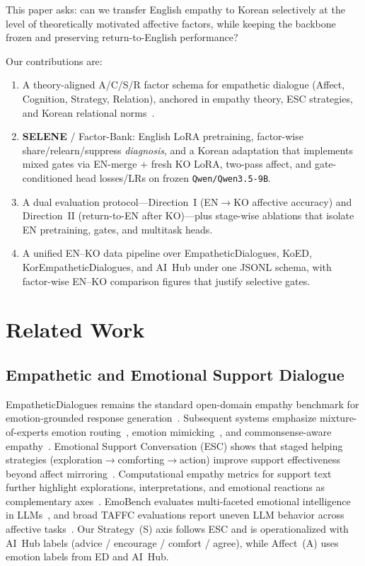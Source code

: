 \documentclass[journal]{IEEEtran}
\begin{document}
This paper asks: can we transfer English empathy to Korean selectively at the level of theoretically motivated affective factors, while keeping the backbone frozen and preserving return-to-English performance?

Our contributions are:
\begin{enumerate}
\item A theory-aligned A/C/S/R factor schema for empathetic dialogue (Affect, Cognition, Strategy, Relation), anchored in empathy theory, ESC strategies, and Korean relational norms~\cite{davis1983empathy,liu2021esc,matsumoto2008culture,lee2025koed}.
\item \textbf{SELENE} / Factor-Bank: English LoRA pretraining, factor-wise share/relearn/suppress \emph{diagnosis}, and a Korean adaptation that implements mixed gates via EN-merge + fresh KO LoRA, two-pass affect, and gate-conditioned head losses/LRs on frozen \texttt{Qwen/Qwen3.5-9B}.
\item A dual evaluation protocol---Direction~I (EN$\rightarrow$KO affective accuracy) and Direction~II (return-to-EN after KO)---plus stage-wise ablations that isolate EN pretraining, gates, and multitask heads.
\item A unified EN--KO data pipeline over EmpatheticDialogues, KoED, KorEmpatheticDialogues, and AI~Hub under one JSONL schema, with factor-wise EN--KO comparison figures that justify selective gates.
\end{enumerate}
\IEEEpubidadjcol

\section{Related Work}

\subsection{Empathetic and Emotional Support Dialogue}
EmpatheticDialogues remains the standard open-domain empathy benchmark for emotion-grounded response generation~\cite{rashkin2019empathetic}.
Subsequent systems emphasize mixture-of-experts emotion routing~\cite{lin2019moel}, emotion mimicking~\cite{majumder2020mime}, and commonsense-aware empathy~\cite{sabour2022cem}.
Emotional Support Conversation (ESC) shows that staged helping strategies (exploration$\rightarrow$comforting$\rightarrow$action) improve support effectiveness beyond affect mirroring~\cite{liu2021esc}.
Computational empathy metrics for support text further highlight explorations, interpretations, and emotional reactions as complementary axes~\cite{sharma2020empathy}.
EmoBench evaluates multi-faceted emotional intelligence in LLMs~\cite{sabour2024emobench}, and broad TAFFC evaluations report uneven LLM behavior across affective tasks~\cite{amin2024chatgpt}.
Our Strategy~(S) axis follows ESC and is operationalized with AI~Hub labels (advice / encourage / comfort / agree), while Affect~(A) uses emotion labels from ED and AI~Hub.
\end{document}
